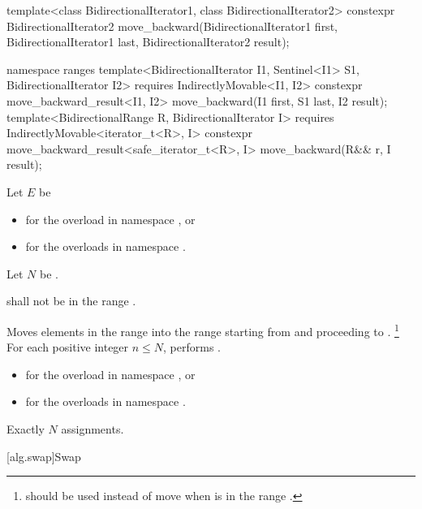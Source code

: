 %
\begin{itemdecl}
template<class BidirectionalIterator1, class BidirectionalIterator2>
  constexpr BidirectionalIterator2
    move_backward(BidirectionalIterator1 first, BidirectionalIterator1 last,
                  BidirectionalIterator2 result);

namespace ranges {
  template<BidirectionalIterator I1, Sentinel<I1> S1, BidirectionalIterator I2>
    requires IndirectlyMovable<I1, I2>
    constexpr move_backward_result<I1, I2>
      move_backward(I1 first, S1 last, I2 result);
  template<BidirectionalRange R, BidirectionalIterator I>
    requires IndirectlyMovable<iterator_t<R>, I>
    constexpr move_backward_result<safe_iterator_t<R>, I>
      move_backward(R&& r, I result);
}
\end{itemdecl}

\begin{itemdescr}
\pnum
Let $E$ be
\begin{itemize}
\item
  for the overload in namespace , or
\item
  for the overloads in namespace .
\end{itemize}
Let $N$ be .

\pnum
\requires
{} shall not be in the range .

\pnum
\effects
Moves elements in the range 
into the range 
starting from  and proceeding to .%
\footnote{ should be used instead of move
when  is in the range .}
For each positive integer $n \le N$,
performs .

\pnum
\returns
\begin{itemize}
\item
  for the overload in namespace , or
\item
  for the overloads in namespace .
\end{itemize}

\pnum
\complexity
Exactly $N$ assignments.
\end{itemdescr}

[alg.swap]{Swap}

